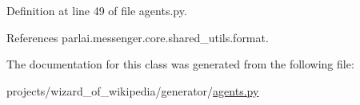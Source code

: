 Definition at line 49 of file agents.\+py.



References parlai.\+messenger.\+core.\+shared\+\_\+utils.\+format.



The documentation for this class was generated from the following file\+:\begin{DoxyCompactItemize}
\item 
projects/wizard\+\_\+of\+\_\+wikipedia/generator/\hyperlink{projects_2wizard__of__wikipedia_2generator_2agents_8py}{agents.\+py}\end{DoxyCompactItemize}
